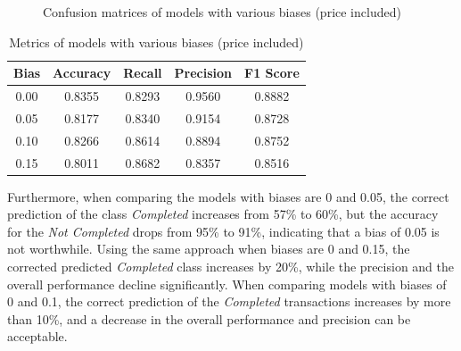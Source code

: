 \documentclass[12pt,twoside]{report}
\begin{document}
\begin{figure}[!htbp]
	\hfill
	\caption{Confusion matrices of models with various biases (price included)}
	\label{status_bias_cm}
\end{figure}

\begin{table}[!htbp]
	\centering
	\caption{Metrics of models with various biases (price included)}
	\label{status_bias_metrics}
	\begin{tabular}{| c | c | c | c | c |}
		\hline
		Bias & Accuracy & Recall & Precision & F1 Score \\
		\hline
		0.00 & 0.8355 & 0.8293 & 0.9560 & 0.8882 \\
		\hline
		0.05 & 0.8177 & 0.8340 & 0.9154 & 0.8728 \\
		\hline
		0.10 & 0.8266 & 0.8614 & 0.8894 & 0.8752 \\
		\hline
		0.15 & 0.8011 & 0.8682 & 0.8357 & 0.8516 \\
		\hline
	\end{tabular}
\end{table}

Furthermore, when comparing the models with biases are 0 and 0.05, the correct prediction of the class \textit{Completed} increases from 57\% to 60\%, but the accuracy for the \textit{Not Completed} drops from 95\% to 91\%, indicating that a bias of 0.05 is not worthwhile. Using the same approach when biases are 0 and 0.15, the corrected predicted \textit{Completed} class increases by 20\%, while the precision and the overall performance decline significantly. When comparing models with biases of 0 and 0.1, the correct prediction of the \textit{Completed} transactions increases by more than 10\%, and a decrease in the overall performance and precision can be acceptable. 
\end{document}
